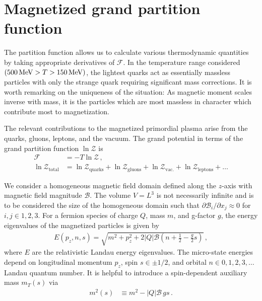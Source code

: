 \documentclass[epjST]{svjour}
\newcommand*{\MeV}{\text{\,MeV}}
\begin{document}
\section{Magnetized grand partition function}
\label{sec:partition}
The partition function allows us to calculate various thermodynamic quantities by taking appropriate derivatives of $\mathcal{F}$. In the temperature range considered $(500\MeV>T>150\MeV)$, the lightest quarks act as essentially massless particles with only the strange quark requiring significant mass corrections. It is worth remarking on the uniqueness of the situation: As magnetic moment scales inverse with mass, it is the particles which are most massless in character which contribute most to magnetization.

The relevant contributions to the magnetized primordial plasma arise from the quarks, gluons, leptons, and the vacuum. The grand potential in terms of the grand partition function $\ln\mathcal{Z}$ is
\begin{align}
    \label{eq:parts}
    \mathcal{F} &= -T\ln\mathcal{Z}\,,\\
    \ln\mathcal{Z}_{\mathrm{total}} &=
    \ln\mathcal{Z}_{\mathrm{quarks}} +
    \ln\mathcal{Z}_{\mathrm{gluons}} +
    \ln\mathcal{Z}_{\mathrm{vac.}} + 
    \ln\mathcal{Z}_{\mathrm{leptons}}+\ldots 
\end{align}

We consider a homogeneous magnetic field domain defined along the $z$-axis with magnetic field magnitude $\mathcal{B}$. The volume $V=L^{3}$ is not necessarily infinite and is to be considered the size of the homogeneous domain such that $\partial\mathcal{B}_{i}/\partial x_{j}\approx0$ for \(i,j \in {1,2,3}\). For a fermion species of charge $Q$, mass $m$, and g-factor $g$, the energy eigenvalues of the magnetized particles is given by~\cite{Steinmetz:2018ryf}
\begin{align}
    \label{eq:energystates}
    E(p_{z},n,s)=\sqrt{m^{2}+p_{z}^{2}+2|Q|\mathcal{B}\left(n+\frac{1}{2}-\frac{g}{2}s\right)}\,,
\end{align}
where $E$ are the relativistic Landau energy eigenvalues. The micro-state energies depend on longitudinal momentum \(p_{z}\), spin $s\in\pm1/2$, and orbital $n\in0,1,2,3,\ldots$ Landau quantum number. It is helpful to introduce a spin-dependent auxiliary mass $m_{T}(s)$ via
\begin{align}
    \label{eq:spinmass}
    m^{2}(s) &\equiv m^{2} - |Q|\mathcal{B}\,g s\,.
\end{align}
\end{document}
